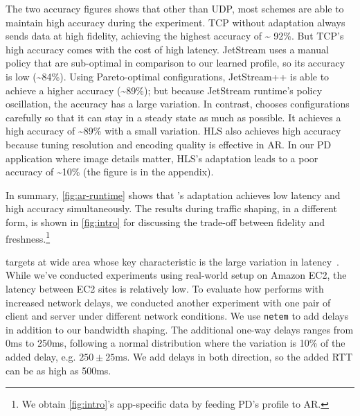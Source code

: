 
The two accuracy figures shows that other than UDP, most schemes are able to
maintain high accuracy during the experiment. TCP without adaptation always
sends data at high fidelity, achieving the highest accuracy of \textasciitilde
92\%. But TCP's high accuracy comes with the cost of high latency. JetStream
uses a manual policy that are sub-optimal in comparison to our learned profile,
so its accuracy is low (\textasciitilde 84\%). Using Pareto-optimal
configurations, JetStream++ is able to achieve a higher accuracy
(\textasciitilde 89\%); but because JetStream runtime's policy oscillation, the
accuracy has a large variation. In contrast, \sysname{} chooses configurations
carefully so that it can stay in a steady state as much as possible.  It
achieves a high accuracy of \textasciitilde 89\% with a small variation. HLS
also achieves high accuracy because tuning resolution and encoding quality is
effective in AR. In our PD application where image details matter, HLS's
adaptation leads to a poor accuracy of \textasciitilde 10\% (the figure is in
the appendix).

In summary, \autoref{fig:ar-runtime} shows that \sysname{}'s adaptation achieves
low latency and high accuracy simultaneously. The results during traffic
shaping, in a different form, is shown in \autoref{fig:intro} for discussing the
trade-off between fidelity and freshness.\footnote{We obtain
  \autoref{fig:intro}'s app-specific data by feeding PD's profile to AR.}

 \sysname{} targets at wide area
whose key characteristic is the large variation in
latency~\cite{li2010cloudcmp}. While we've conducted experiments using
real-world setup on Amazon EC2, the latency between EC2 sites is relatively low.
To evaluate how \sysname{} performs with increased network delays, we conducted
another experiment with one pair of client and server under different network
conditions. We use \texttt{netem} to add delays in addition to our bandwidth
shaping. The additional one-way delays ranges from 0ms to 250ms, following a
normal distribution where the variation is 10\% of the added delay, e.g.
$250\pm 25\text{ms}$. We add delays in both direction, so the added RTT can be
as high as 500ms.

